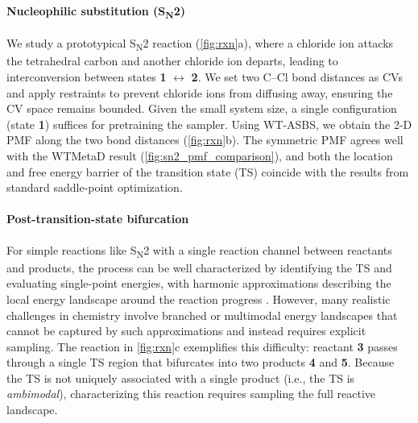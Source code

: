 \documentclass[]{fairmeta}
\newcommand{\tsub}{\textsubscript}
\theoremstyle{remark}
\begin{document}
\paragraph{Nucleophilic substitution (S\tsub{N}2)}
We study a prototypical S\tsub{N}2 reaction (\cref{fig:rxn}a), where a chloride ion attacks the tetrahedral carbon and another chloride ion departs, leading to interconversion between states \textbf{1} $\leftrightarrow$ \textbf{2}.
We set two C--Cl bond distances as CVs and apply restraints to prevent chloride ions from diffusing away, ensuring the CV space remains bounded.
Given the small system size, a single configuration (state \textbf{1}) suffices for pretraining the sampler.
Using WT-ASBS, we obtain the 2-D PMF along the two bond distances (\cref{fig:rxn}b).
The symmetric PMF agrees well with the WTMetaD result (\cref{fig:sn2_pmf_comparison}), and both the location and free energy barrier of the transition state (TS) coincide with the results from standard saddle-point optimization.

\paragraph{Post-transition-state bifurcation}
For simple reactions like S\tsub{N}2 with a single reaction channel between reactants and products, the process can be well characterized by identifying the TS and evaluating single-point energies, with harmonic approximations describing the local energy landscape around the reaction progress \citep{truhlar1996current,peters2017reaction}.
However, many realistic challenges in chemistry involve branched or multimodal energy landscapes that cannot be captured by such approximations and instead requires explicit sampling.
The reaction in \cref{fig:rxn}c exemplifies this difficulty: reactant \textbf{3} passes through a single TS region that bifurcates into two products \textbf{4} and \textbf{5}.
Because the TS is not uniquely associated with a single product (i.e., the TS is \textit{ambimodal}), characterizing this reaction requires sampling the full reactive landscape.
\end{document}
